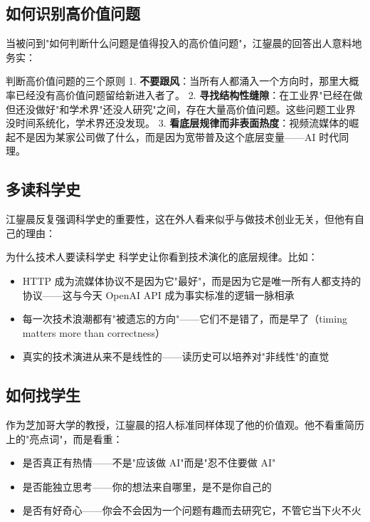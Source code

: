\documentclass[a4paper]{article}
\begin{document}
\subsection{如何识别高价值问题}

当被问到"如何判断什么问题是值得投入的高价值问题"，江鋆晨的回答出人意料地务实：

\begin{importantbox}{判断高价值问题的三个原则}
1. \textbf{不要跟风}：当所有人都涌入一个方向时，那里大概率已经没有高价值问题留给新进入者了。
2. \textbf{寻找结构性缝隙}：在工业界"已经在做但还没做好"和学术界"还没人研究"之间，存在大量高价值问题。这些问题工业界没时间系统化，学术界还没发现。
3. \textbf{看底层规律而非表面热度}：视频流媒体的崛起不是因为某家公司做了什么，而是因为宽带普及这个底层变量——AI 时代同理。
\end{importantbox}

\subsection{多读科学史}

江鋆晨反复强调科学史的重要性，这在外人看来似乎与做技术创业无关，但他有自己的理由：

\begin{knowledgebox}{为什么技术人要读科学史}
科学史让你看到技术演化的底层规律。比如：
\begin{itemize}
\item HTTP 成为流媒体协议不是因为它"最好"，而是因为它是唯一所有人都支持的协议——这与今天 OpenAI API 成为事实标准的逻辑一脉相承
\item 每一次技术浪潮都有"被遗忘的方向"——它们不是错了，而是早了（timing matters more than correctness）
\item 真实的技术演进从来不是线性的——读历史可以培养对"非线性"的直觉
\end{itemize}
\end{knowledgebox}

\subsection{如何找学生}

作为芝加哥大学的教授，江鋆晨的招人标准同样体现了他的价值观。他不看重简历上的"亮点词"，而是看重：

\begin{itemize}
\item 是否真正有热情——不是"应该做 AI"而是"忍不住要做 AI"
\item 是否能独立思考——你的想法来自哪里，是不是你自己的
\item 是否有好奇心——你会不会因为一个问题有趣而去研究它，不管它当下火不火
\end{itemize}
\end{document}
